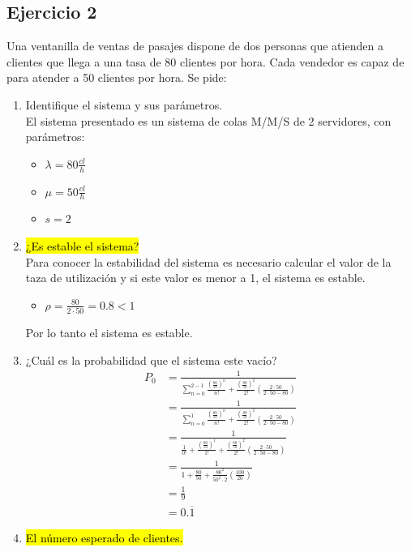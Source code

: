 \documentclass{templateNote}
\begin{document}
\newpage
\subsection{Ejercicio 2}
\noindent Una ventanilla de ventas de pasajes dispone de dos personas que atienden a clientes que llega a una tasa de 80 clientes por hora. Cada vendedor es capaz de para atender a 50 clientes por hora. Se pide:
\begin{enumerate}[label=(\alph*)]
    \item Identifique el sistema y sus parámetros. \\
    El sistema presentado es un sistema de colas M/M/S de 2 servidores, con parámetros:
    \begin{itemize}
        \item $\lambda = 80 \frac{cl}{h}$
        \item $\mu = 50 \frac{cl}{h}$
        \item $s = 2$
    \end{itemize}
    \item \hl{¿Es estable el sistema?} \\
    Para conocer la estabilidad del sistema es necesario calcular el valor de la taza de utilización y si este valor es menor a 1, el sistema es estable.
    \begin{itemize}
        \item $\rho = \frac{80}{2 \cdot 50} = 0.8 < 1$
    \end{itemize}
    Por lo tanto el sistema es estable.
    \item ¿Cuál es la probabilidad que el sistema este vacío?
    \begin{align*}
        P_0 &= \frac{1}{\sum_{n=0}^{2-1} \frac{(\frac{80}{50})^n}{n!} + \frac{(\frac{80}{50})^2}{2!} \left(\frac{2\cdot50}{2\cdot50-80}\right)} \\
        &= \frac{1}{\sum_{n=0}^{1} \frac{(\frac{80}{50})^n}{n!} + \frac{(\frac{80}{50})^2}{2!} \left(\frac{2\cdot50}{2\cdot50-80}\right)} \\
        &= \frac{1}{\frac{1}{0!} + \frac{(\frac{80}{50})^1}{1!} + \frac{(\frac{80}{50})^2}{2!} \left(\frac{2\cdot50}{2\cdot50-80}\right)} \\
        &= \frac{1}{1 + \frac{80}{50} + \frac{80^2}{50^2 \cdot 2} \left(\frac{100}{20}\right)} \\
        &= \frac{1}{9} \\
        &= 0.\overline{1}
    \end{align*} 
    \item \hl{El número esperado de clientes.}\\
    

\end{enumerate}
\end{document}
